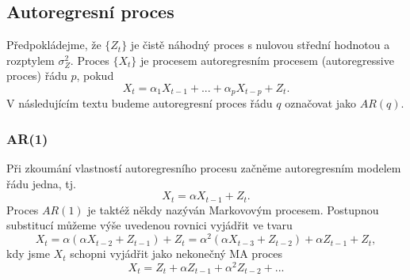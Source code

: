 \subsection{Autoregresní proces}

Předpokládejme, že $\{Z_t\}$ je čistě náhodný proces s nulovou střední hodnotou a rozptylem $\sigma^2_Z$. Proces $\{X_t\}$ je procesem autoregresním procesem (autoregressive proces) řádu $p$, pokud
\begin{equation}
X_t = \alpha_1 X_{t - 1} + ... + \alpha_p X_{t - p} + Z_t.
\end{equation}
V následujícím textu budeme autoregresní proces řádu $q$ označovat jako $AR(q)$.

\subsubsection{AR(1)}

Při zkoumání vlastností autoregresního procesu začněme autoregresním modelem řádu jedna, tj.
\begin{equation}
X_t = \alpha X_{t-1} + Z_t.
\end{equation}
Proces $AR(1)$ je taktéž někdy nazýván Markovovým procesem. Postupnou substitucí můžeme výše uvedenou rovnici vyjádřit ve tvaru
\begin{equation}
X_t = \alpha(\alpha X_{t - 2} + Z_{t - 1}) + Z_t = \alpha^2 (\alpha X_{t - 3} + Z_{t - 2}) + \alpha Z_{t - 1} + Z_t,
\end{equation}
kdy jsme $X_t$ schopni vyjádřit jako nekonečný MA proces
\begin{equation}
X_t = Z_t + \alpha Z_{t - 1} + \alpha^2 Z_{t - 2} + ...
\end{equation}

